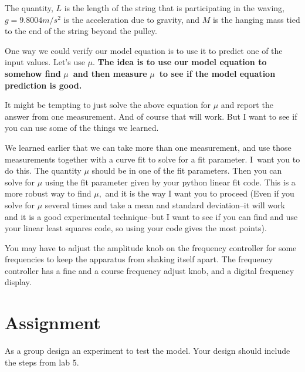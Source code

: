 \documentclass{book}
\begin{document}
The quantity, $L$ is the length of the string that is participating in the
waving, $g=9.8004\unit{m}/\unit{s}^2$ is the acceleration due to gravity, and $M$ is the hanging mass tied to
the end of the string beyond the pulley.

One way we could verify our model equation is to use it to predict one of the
input values. Let's use $\mu$. \textbf{The idea is to use our model equation
to somehow find }$\mu$\textbf{\ and then measure }$\mu$\textbf{\ to see if the
model equation prediction is good.}

It might be tempting to just solve the above equation for $\mu$ and report the
answer from one measurement. And of course that will work. But I want to see if you can use some of the things we learned.

We learned earlier that we can take more than one measurement, and use those
measurements together with a curve fit to solve for a fit parameter. I\ want
you to do this. The quantity $\mu$ should be in one of the fit parameters.
Then you can solve for $\mu$ using the fit parameter given by your python
linear fit code. This is a more robust way to find $\mu,$ and it is the way I want you to proceed (Even
if you solve for $\mu$ several times and take a mean and standard
deviation--it will work and it is a good experimental technique--but I want to
see if you can find and use your linear least squares code, so using your code
gives the most points).

You may have to adjust the amplitude knob on the frequency controller for some
frequencies to keep the apparatus from shaking itself apart. The frequency
controller has a fine and a course frequency adjust knob, and a digital
frequency display.

\section{Assignment}

As a group design an experiment to test the model. Your design should
include the steps from lab 5.
\end{document}
